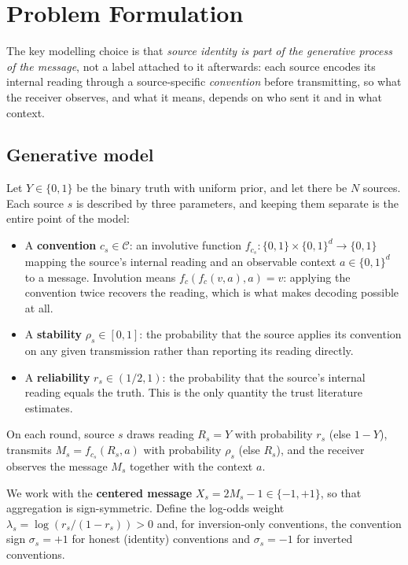 \section{Problem Formulation}
\label{sec:formal}

The key modelling choice is that \emph{source identity is part of the
generative process of the message}, not a label attached to it afterwards:
each source encodes its internal reading through a source-specific
\emph{convention} before transmitting, so what the receiver observes, and
what it means, depends on who sent it and in what context.

\subsection{Generative model}

Let $Y \in \{0,1\}$ be the binary truth with uniform prior, and let there
be $N$ sources. Each source $s$ is described by three parameters, and
keeping them separate is the entire point of the model:

\begin{itemize}
\item A \textbf{convention} $c_s \in \mathcal{C}$: an involutive function
$f_{c_s} : \{0,1\} \times \{0,1\}^d \to \{0,1\}$ mapping the source's
internal reading and an observable context $a \in \{0,1\}^d$ to a message.
Involution means $f_c(f_c(v,a),a) = v$: applying the convention twice
recovers the reading, which is what makes decoding possible at all.
\item A \textbf{stability} $\rho_s \in [0,1]$: the probability that the
source applies its convention on any given transmission rather than
reporting its reading directly.
\item A \textbf{reliability} $r_s \in (1/2, 1)$: the probability that the
source's internal reading equals the truth. This is the only quantity the
trust literature estimates.
\end{itemize}

On each round, source $s$ draws reading $R_s = Y$ with probability
$r_s$ (else $1-Y$), transmits $M_s = f_{c_s}(R_s, a)$ with probability
$\rho_s$ (else $R_s$), and the receiver observes the message $M_s$ together
with the context $a$.

We work with the \textbf{centered message} $X_s = 2M_s - 1 \in \{-1,+1\}$,
so that aggregation is sign-symmetric. Define the log-odds weight
$\lambda_s = \log(r_s/(1-r_s)) > 0$ and, for inversion-only conventions,
the convention sign $\sigma_s = +1$ for honest (identity) conventions and
$\sigma_s = -1$ for inverted conventions.

